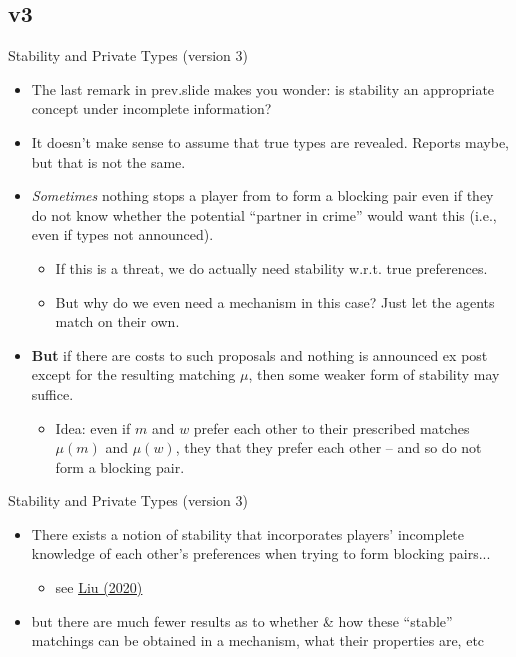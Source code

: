 \documentclass[english,10pt
,aspectratio=169
]{beamer}
\begin{document}
\subsection{v3}

\begin{frame}{Stability and Private Types (version 3)}
\begin{itemize}
	\item The last remark in prev.slide makes you wonder: is \alert{stability} an appropriate concept under incomplete information?
	\item It doesn't make sense to assume that true types are revealed. Reports maybe, but that is not the same.
	\item \emph{Sometimes} nothing stops a player from  to form a blocking pair even if they do not know whether the potential ``partner in crime'' would want this (i.e., even if types not announced).
	\begin{itemize}
		\item If this is a threat, we do actually need stability w.r.t. true preferences.
		\item But why do we even need a mechanism in this case? Just let the agents match on their own.
	\end{itemize}
	\item \textbf{But} if there are costs to such proposals and nothing is announced ex post except for the resulting matching $\mu$, then some weaker form of stability may suffice.
	\begin{itemize}
		\item Idea: even if $m$ and $w$ prefer each other to their prescribed matches $\mu(m)$ and $\mu(w)$, they  that they prefer each other -- and so do not form a blocking pair.
	\end{itemize}
\end{itemize}
\end{frame}


\begin{frame}{Stability and Private Types (version 3)}
\begin{itemize}
	\item There exists a notion of stability that incorporates players' incomplete knowledge of each other's preferences when trying to form blocking pairs...
	\begin{itemize}
		\item see \href{https://www.aeaweb.org/articles/pdf/doi/10.1257/aer.20181186}{\uline{Liu (2020)}}
	\end{itemize}
	\item but there are much fewer results as to whether \& how these ``stable'' matchings can be obtained in a mechanism, what their properties are, etc
\end{itemize}
\end{frame}
\end{document}
